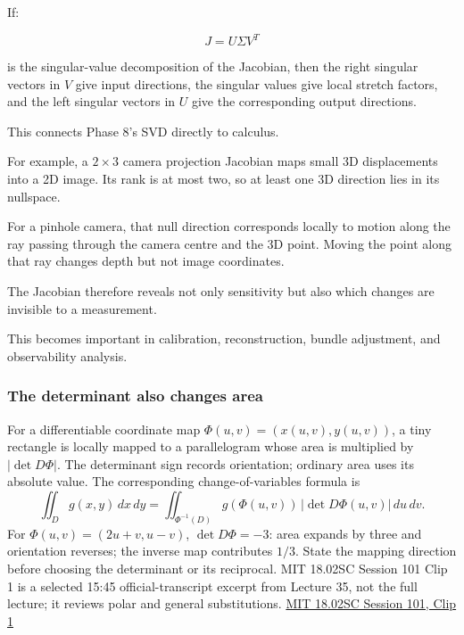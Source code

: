 If:

\[
J=U\Sigma V^T
\]

is the singular-value decomposition of the Jacobian, then the right singular vectors in \(V\) give input directions, the singular values give local stretch factors, and the left singular vectors in \(U\) give the corresponding output directions.

This connects Phase 8's SVD directly to calculus.

For example, a \(2\times3\) camera projection Jacobian maps small 3D displacements into a 2D image. Its rank is at most two, so at least one 3D direction lies in its nullspace.

For a pinhole camera, that null direction corresponds locally to motion along the ray passing through the camera centre and the 3D point. Moving the point along that ray changes depth but not image coordinates.

The Jacobian therefore reveals not only sensitivity but also which changes are invisible to a measurement.

This becomes important in calibration, reconstruction, bundle adjustment, and observability analysis.

\subsubsection{The determinant also changes area}\label{02-foundations-ii-ch021-the-determinant-also-changes-area}

\hypertarget{02-foundations-ii-ch021-the-determinant-also-changes-area}{}

For a differentiable coordinate map \(\Phi(u,v)=(x(u,v),y(u,v))\), a tiny rectangle is locally mapped to a parallelogram whose area is multiplied by \(|\det D\Phi|\). The determinant sign records orientation; ordinary area uses its absolute value. The corresponding change-of-variables formula is \[
\iint_D g(x,y)\,dx\,dy
=
\iint_{\Phi^{-1}(D)}g(\Phi(u,v))\,|\det D\Phi(u,v)|\,du\,dv.
\] For \(\Phi(u,v)=(2u+v,u-v)\), \(\det D\Phi=-3\): area expands by three and orientation reverses; the inverse map contributes \(1/3\). State the mapping direction before choosing the determinant or its reciprocal. MIT 18.02SC Session 101 Clip 1 is a selected 15:45 official-transcript excerpt from Lecture 35, not the full lecture; it reviews polar and general substitutions. \href{https://ocw.mit.edu/courses/18-02sc-multivariable-calculus-fall-2010/resources/clip-1-double-integrals-jacobian-triple-integrals/}{MIT 18.02SC Session 101, Clip 1}

